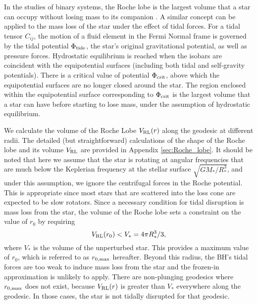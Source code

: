\documentclass[useAMS,usenatbib]{mn2e}
\def\VRL{V_{\rm RL}}
\begin{document}
In the studies of binary systems, the Roche lobe is the largest volume that a star can occupy without losing mass to its companion \citep{Paczynski1971}.
A similar concept can be applied to the mass loss of the star under the effect of tidal forces.
For a tidal tensor $C_{ij}$, the motion of a fluid element in the Fermi Normal frame is governed by the tidal potential $\Phi_{\rm tide}$, the star's original gravitational potential, as well as pressure forces. Hydrostatic equilibrium is reached when the isobars are coincident with the equipotential surfaces (including both tidal and self-gravity potentials). There is a critical value of potential $\Phi_{\rm crit}$, above which the equipotential surfaces are no longer closed around the star. The region enclosed within the equipotential surface corresponding to $\Phi_{\rm crit}$ is the largest volume that a star can have before starting to lose mass, under the assumption of hydrostatic equilibrium.

We calculate the volume of the Roche Lobe $\VRL(r)$ along the geodesic at different radii. The detailed (but straightforward) calculations of the shape of the Roche lobe and its volume $\VRL$ are provided in Appendix \ref{sec:Roche_lobe}. It should be noted that here we assume that the star is rotating at angular frequencies that are much below the Keplerian frequency at the stellar surface $\sqrt{GM_*/R_*^3}$, and under this assumption, we ignore the centrifugal forces in the Roche potential. This is appropriate since most stars that are scattered into the loss cone are expected to be slow rotators. Since a necessary condition for tidal disruption is mass loss from the star, the volume of the Roche lobe sets a constraint on the value of $r_0$ by requiring
\begin{equation}
    \VRL(r_0) < V_* = 4\pi R_*^3/3,
\end{equation}
where $V_*$ is the volume of the unperturbed star. This provides a maximum value of $r_0$, which is referred to as $r_{\rm 0,max}$ hereafter. Beyond this radius, the BH's tidal forces are too weak to induce mass loss from the star and the frozen-in approximation is unlikely to apply. There are non-plunging geodesics where $r_{\rm 0,max}$ does not exist, because $\VRL(r)$ is greater than $V_*$ everywhere along the geodesic. In those cases, the star is not tidally disrupted for that geodesic.
\end{document}
